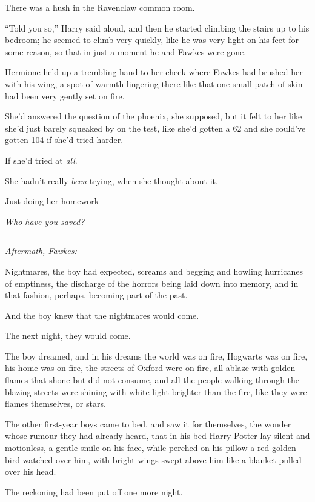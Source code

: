 There was a hush in the Ravenclaw common room.

``Told you so,'' Harry said aloud, and then he started climbing the
stairs up to his bedroom; he seemed to climb very quickly, like he was
very light on his feet for some reason, so that in just a moment he and
Fawkes were gone.

Hermione held up a trembling hand to her cheek where Fawkes had brushed
her with his wing, a spot of warmth lingering there like that one small
patch of skin had been very gently set on fire.

She'd answered the question of the phoenix, she supposed, but it felt to
her like she'd just barely squeaked by on the test, like she'd gotten a
62 and she could've gotten 104 if she'd tried harder.

If she'd tried at \emph{all}.

She hadn't really \emph{been} trying, when she thought about it.

Just doing her homework---

\emph{Who have you saved?}

\begin{center}\rule{3in}{0.4pt}\end{center}

\emph{Aftermath, Fawkes:}

Nightmares, the boy had expected, screams and begging and howling
hurricanes of emptiness, the discharge of the horrors being laid down
into memory, and in that fashion, perhaps, becoming part of the past.

And the boy knew that the nightmares would come.

The next night, they would come.

The boy dreamed, and in his dreams the world was on fire, Hogwarts was
on fire, his home was on fire, the streets of Oxford were on fire, all
ablaze with golden flames that shone but did not consume, and all the
people walking through the blazing streets were shining with white light
brighter than the fire, like they were flames themselves, or stars.

The other first-year boys came to bed, and saw it for themselves, the
wonder whose rumour they had already heard, that in his bed Harry Potter
lay silent and motionless, a gentle smile on his face, while perched on
his pillow a red-golden bird watched over him, with bright wings swept
above him like a blanket pulled over his head.

The reckoning had been put off one more night.

